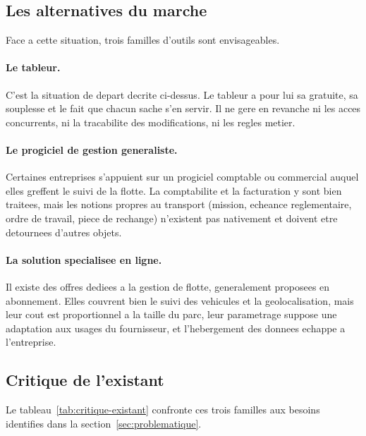 \subsection{Les alternatives du marche}

Face a cette situation, trois familles d'outils sont envisageables.

\paragraph{Le tableur.}
C'est la situation de depart decrite ci-dessus. Le tableur a pour lui sa
gratuite, sa souplesse et le fait que chacun sache s'en servir. Il ne
gere en revanche ni les acces concurrents, ni la tracabilite des
modifications, ni les regles metier.

\paragraph{Le progiciel de gestion generaliste.}
Certaines entreprises s'appuient sur un progiciel comptable ou commercial
auquel elles greffent le suivi de la flotte. La comptabilite et la
facturation y sont bien traitees, mais les notions propres au transport
(mission, echeance reglementaire, ordre de travail, piece de rechange)
n'existent pas nativement et doivent etre detournees d'autres objets.

\paragraph{La solution specialisee en ligne.}
Il existe des offres dediees a la gestion de flotte, generalement
proposees en abonnement. Elles couvrent bien le suivi des vehicules et la
geolocalisation, mais leur cout est proportionnel a la taille du parc,
leur parametrage suppose une adaptation aux usages du fournisseur, et
l'hebergement des donnees echappe a l'entreprise.

\subsection{Critique de l'existant}

Le tableau~\ref{tab:critique-existant} confronte ces trois familles aux
besoins identifies dans la section~\ref{sec:problematique}.

